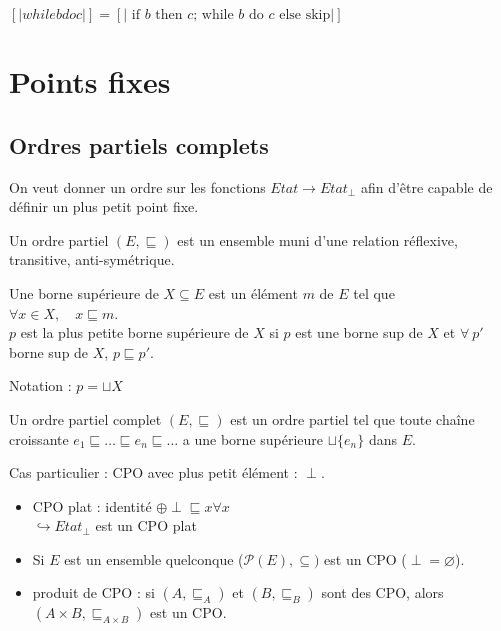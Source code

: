 \documentclass[10pt,a4paper]{article}
\newcommand{\semm}[1]{\left[| #1 | \right]}
\begin{document}
\begin{prop}
$ \semm{while b do c} = \semm{\text{ if $b$ then $c$; while $b$ do $c$ else skip}}$
\end{prop}


\section{Points fixes}

\subsection{Ordres partiels complets}
On veut donner un ordre sur les fonctions $Etat \rightarrow Etat_{\perp}$ afin d'être capable de définir un plus petit point fixe.
\begin{definition}
 Un ordre partiel $(E,\sqsubseteq)$ est un ensemble muni d'une relation réflexive, transitive, anti-symétrique.
\end{definition}
\begin{definition}
 Une borne supérieure de $X \subseteq E$ est un élément $m$ de $E$ tel que \\
\indent $\forall x \in X, \quad x \sqsubseteq m$.\\
$p$ est la plus petite borne supérieure de $X$ si $p$ est une borne sup de $X$ et $\forall \: p'$ borne sup de $X$, $p \sqsubseteq p'$.

Notation : $p = \sqcup X$
\end{definition}
\begin{definition}
 Un ordre partiel complet $(E,\sqsubseteq)$ est un ordre partiel tel que toute chaîne croissante $e_1 \sqsubseteq \dots \sqsubseteq e_n \sqsubseteq \dots $ a une borne supérieure $\sqcup \{ e_n \}$ dans $E$.

 Cas particulier : CPO avec plus petit élément : $\perp$.
\end{definition}
\begin{exs}[de CPO :]
 \begin{itemize}
  \item CPO plat : identité $\oplus \perp \sqsubseteq x \forall x$ 
  \\ $\hookrightarrow Etat_{\perp}$ est un CPO plat
  \item Si $E$ est un ensemble quelconque ($\mathcal{P}(E), \subseteq)$ est un CPO ($\perp = \varnothing $).
  \item produit de CPO : si $(A, \sqsubseteq_A)$ et $(B, \sqsubseteq_B)$ sont des CPO, alors $(A\times B, \sqsubseteq_{A\times B})$ est un CPO.
 \end{itemize}

\end{exs}
\end{document}
